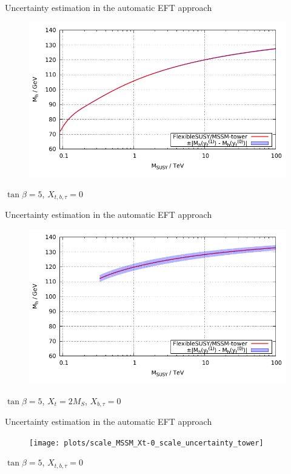 \documentclass[hyperref={pdfpagelabels=false},ngerman]{beamer}
\begin{document}
\begin{frame}{Uncertainty estimation in the automatic EFT approach}
  \begin{figure}
    \centering
    \includegraphics[width=\textwidth]{plots/scale_MSSM_uncertainty_tower_yt}
  \end{figure}
  $\tan\beta = 5$, $X_{t,b,\tau} = 0$
\end{frame}

\begin{frame}{Uncertainty estimation in the automatic EFT approach}
  \begin{figure}
    \centering
    \includegraphics[width=\textwidth]{plots/scale_MSSM_Xt-2_uncertainty_tower}
  \end{figure}
  $\tan\beta = 5$, $X_t = 2 M_S$, $X_{b,\tau} = 0$
\end{frame}

\begin{frame}{Uncertainty estimation in the automatic EFT approach}
  \begin{figure}
    \centering
    \texttt{[image: plots/scale\_MSSM\_Xt-0\_scale\_uncertainty\_tower]}
  \end{figure}
  $\tan\beta = 5$, $X_{t,b,\tau} = 0$
\end{frame}
\end{document}
